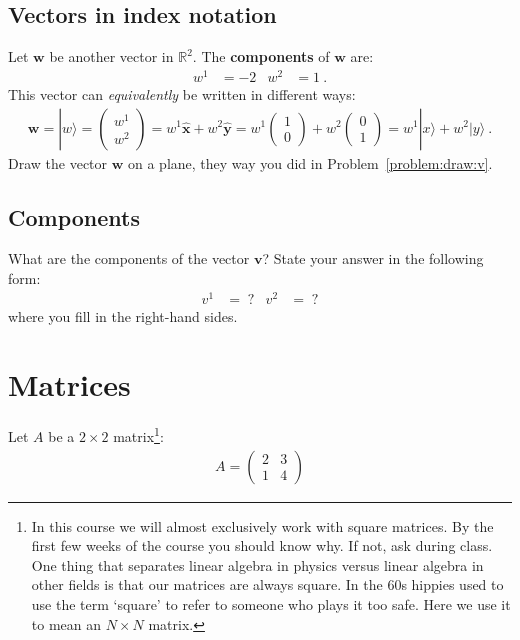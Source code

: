 \documentclass[12pt]{article}
\numberwithin{equation}{section}    %
\renewcommand{\vec}[1]{\mathbf{#1}} %
\begin{document}
\subsection{Vectors in index notation}

Let $\vec{w}$ be another vector in $\mathbb{R}^2$. The \textbf{components} of $\vec{w}$ are:
\begin{align}
	w^1 &= -2
	&
	w^2 &= 1 \ .
\end{align}
This vector can \emph{equivalently} be written in different ways:
\begin{align}
	\vec{w} = |w\rangle = 
	\begin{pmatrix}
		w^1 \\ w^2
	\end{pmatrix}
	=
	w^1 \hat{\vec{x}} + w^2\hat{\vec{y}}
	= 
	w^1 \begin{pmatrix} 1\\0 \end{pmatrix} + w^2 \begin{pmatrix} 0\\1 \end{pmatrix}
	=
	w^1|x\rangle + w^2|y\rangle \ .
\end{align}
Draw the vector $\vec{w}$ on a plane, they way you did in Problem~\ref{problem:draw:v}.

\subsection{Components}

What are the components of the vector $\vec{v}$? State your answer in the following form:
\begin{align}
	v^1 &= \; ?
	&
	v^2 &= \; ?
\end{align}
where you fill in the right-hand sides.






\section{Matrices}

Let $A$ be a $2\times 2$ matrix\footnote{In this course we will almost exclusively work with square matrices. By the first few weeks of the course you should know why. If not, ask during class. One thing that separates linear algebra in physics versus linear algebra in other fields is that our matrices are always square. In the 60s hippies used to use the term `square' to refer to someone who plays it too safe. Here we use it to mean an $N\times N$ matrix.}:
\begin{align}
	A = 
	\begin{pmatrix}
		2 & 3\\
		1 & 4		
	\end{pmatrix}
\end{align}
\end{document}
